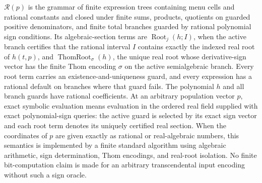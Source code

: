\(\mathcal R(p)\) is the grammar of finite expression trees containing menu cells and rational constants and closed under finite sums, products, quotients on guarded positive denominators, and finite total branches guarded by rational polynomial sign conditions.  Its algebraic-section terms are \(\operatorname{Root}_j(h;I)\), when the active branch certifies that the rational interval \(I\) contains exactly the indexed real root of \(h(t,p)\), and \(\operatorname{ThomRoot}_{\sigma}(h)\), the unique real root whose derivative-sign vector has the finite Thom encoding \(\sigma\) on the active semialgebraic branch.  Every root term carries an existence-and-uniqueness guard, and every expression has a rational default on branches where that guard fails.  The polynomial \(h\) and all branch guards have rational coefficients.  At an arbitrary population vector \(p\), exact symbolic evaluation means evaluation in the ordered real field supplied with exact polynomial-sign queries: the active guard is selected by its exact sign vector and each root term denotes its uniquely certified real section.  When the coordinates of \(p\) are given exactly as rational or real-algebraic numbers, this semantics is implemented by a finite standard algorithm using algebraic arithmetic, sign determination, Thom encodings, and real-root isolation.  No finite bit-computation claim is made for an arbitrary transcendental input encoding without such a sign oracle.